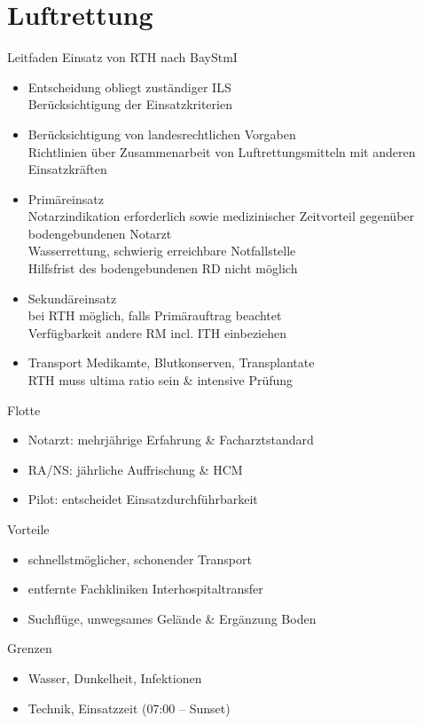 \section{Luftrettung}
\begin{sectionbox}{Leitfaden Einsatz von RTH nach BayStmI}
    \begin{itemize}
        \item Entscheidung obliegt zuständiger ILS\\
        \ra Berücksichtigung der Einsatzkriterien
        \item Berücksichtigung von landesrechtlichen Vorgaben\\
        \ra Richtlinien über Zusammenarbeit von Luftrettungsmitteln mit anderen Einsatzkräften
        \item Primäreinsatz\\
        \ra Notarzindikation erforderlich sowie medizinischer Zeitvorteil gegenüber bodengebundenen Notarzt\\
        \ra Wasserrettung, schwierig erreichbare Notfallstelle\\
        \ra Hilfsfrist des bodengebundenen RD nicht möglich
        \item Sekundäreinsatz\\
        \ra bei RTH möglich, falls Primärauftrag beachtet\\
        \ra Verfügbarkeit andere RM incl. ITH einbeziehen
        \item Transport Medikamte, Blutkonserven, Transplantate\\
        \ra RTH muss ultima ratio sein \& intensive Prüfung 
    \end{itemize}
\end{sectionbox}
\begin{sectionbox}{Flotte}
    \begin{itemize}
        \item Notarzt: mehrjährige Erfahrung \& Facharztstandard
        \item RA/NS: jährliche Auffrischung \& HCM
        \item Pilot: entscheidet Einsatzdurchführbarkeit
    \end{itemize}
\end{sectionbox}
\begin{sectionbox}{Vorteile}
    \begin{itemize}
        \item schnellstmöglicher, schonender Transport
        \item entfernte Fachkliniken \ra Interhospitaltransfer
        \item Suchflüge, unwegsames Gelände \& Ergänzung Boden
    \end{itemize}
\end{sectionbox}
\begin{sectionbox}{Grenzen}
    \begin{itemize}
        \item Wasser, Dunkelheit, Infektionen
        \item Technik, Einsatzzeit (07:00 -- Sunset)
    \end{itemize}
\end{sectionbox}